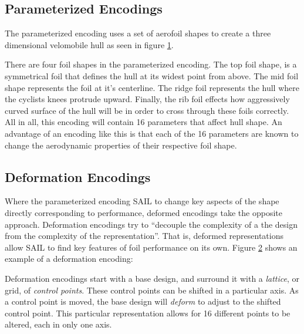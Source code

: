 \documentclass{sig-alternate}
\begin{document}
\subsection{Parameterized Encodings}
The parameterized encoding uses a set of aerofoil shapes to create a three dimensional velomobile hull as seen in figure \ref{fig:ParameterizedEncoding}.

\begin{figure}[htb]
\centering
{}
\label{fig:ParameterizedEncoding}
\caption{}
\end{figure}

There are four foil shapes in the parameterized encoding.
The top foil shape, is a symmetrical foil that defines the hull at its widest point from above.
The mid foil shape represents the foil at it's centerline.
The ridge foil represents the hull where the cyclists knees protrude upward.
Finally, the rib foil effects how aggressively curved surface of the hull will be in order to cross through these foils correctly.
All in all, this encoding will contain 16 parameters that affect hull shape. 
An advantage of an encoding like this is that each of the 16 parameters are known to change the aerodynamic properties of their respective foil shape.

\subsection{Deformation Encodings}
Where the parameterized encoding SAIL to change key aspects of the shape directly corresponding to performance, deformed encodings take the opposite approach.
Deformation encodings try to ``decouple the complexity of a the design from the complexity of the representation''.
That is, deformed representations allow SAIL to find key features of foil performance on its own.
Figure \ref{fig:Deformation} shows an example of a deformation encoding:

\begin{figure}[htb]
\centering
{}
\label{fig:Deformation}
\caption{}
\end{figure}

Deformation encodings start with a base design, and surround it with a \textit{lattice}, or grid, of \textit{control points}.
These control points can be shifted in a particular axis.
As a control point is moved, the base design will \textit{deform} to adjust to the shifted control point.
This particular representation allows for 16 different points to be altered, each in only one axis.
\end{document}
